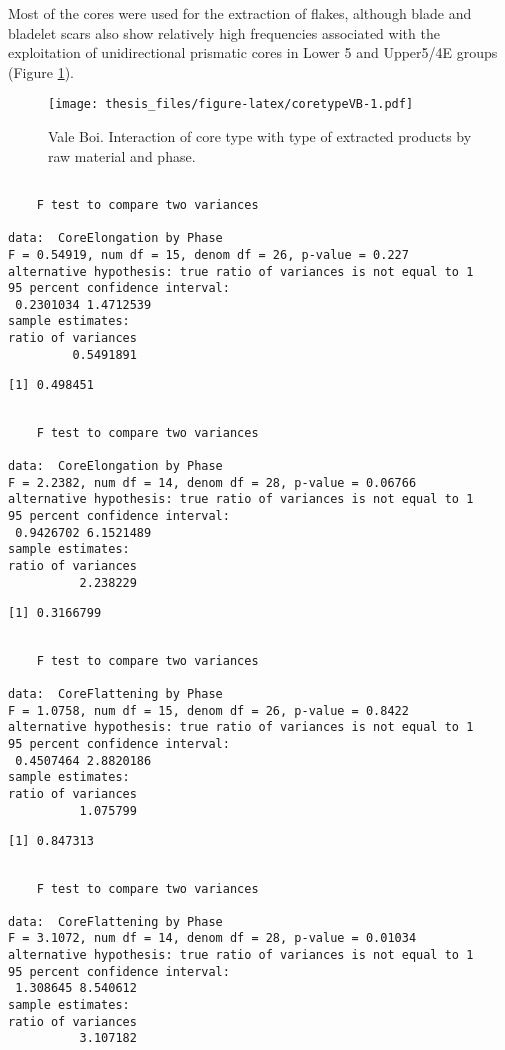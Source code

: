 \documentclass[12pt,twoside]{reedthesis}
\begin{document}
Most of the cores were used for the extraction of flakes, although blade and bladelet scars also show relatively high frequencies associated with the exploitation of unidirectional prismatic cores in Lower 5 and Upper5/4E groups (Figure \ref{fig:coretypeVB}).
\begin{figure}
\centering
\texttt{[image: thesis\_files/figure-latex/coretypeVB-1.pdf]}
\caption{\label{fig:coretypeVB}Vale Boi. Interaction of core type with type of extracted products by raw material and phase.}
\end{figure}
\begin{verbatim}

    F test to compare two variances

data:  CoreElongation by Phase
F = 0.54919, num df = 15, denom df = 26, p-value = 0.227
alternative hypothesis: true ratio of variances is not equal to 1
95 percent confidence interval:
 0.2301034 1.4712539
sample estimates:
ratio of variances 
         0.5491891 
\end{verbatim}
\begin{verbatim}
[1] 0.498451
\end{verbatim}
\begin{verbatim}

    F test to compare two variances

data:  CoreElongation by Phase
F = 2.2382, num df = 14, denom df = 28, p-value = 0.06766
alternative hypothesis: true ratio of variances is not equal to 1
95 percent confidence interval:
 0.9426702 6.1521489
sample estimates:
ratio of variances 
          2.238229 
\end{verbatim}
\begin{verbatim}
[1] 0.3166799
\end{verbatim}
\begin{verbatim}

    F test to compare two variances

data:  CoreFlattening by Phase
F = 1.0758, num df = 15, denom df = 26, p-value = 0.8422
alternative hypothesis: true ratio of variances is not equal to 1
95 percent confidence interval:
 0.4507464 2.8820186
sample estimates:
ratio of variances 
          1.075799 
\end{verbatim}
\begin{verbatim}
[1] 0.847313
\end{verbatim}
\begin{verbatim}

    F test to compare two variances

data:  CoreFlattening by Phase
F = 3.1072, num df = 14, denom df = 28, p-value = 0.01034
alternative hypothesis: true ratio of variances is not equal to 1
95 percent confidence interval:
 1.308645 8.540612
sample estimates:
ratio of variances 
          3.107182 
\end{verbatim}
\end{document}
